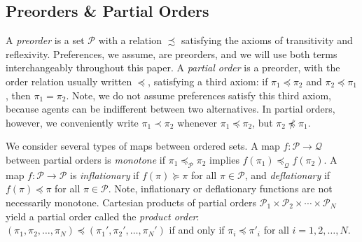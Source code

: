 \documentclass[conference]{ieeeconf}
\renewcommand{\preceq}{\preccurlyeq}
\renewcommand{\succeq}{\succcurlyeq}
\renewcommand{\P}{\mathcal{P}}
\newcommand{\Q}{\mathcal{Q}}
\renewcommand{\L}{\mathcal{L}}
\DeclareMathOperator{\Fix}{Fix}
\DeclareMathOperator{\Pre}{Prefix}
\DeclareMathOperator{\Post}{Suffix}
\DeclareMathOperator{\lfp}{lfp}
\DeclareMathOperator{\gfp}{gfp}
\newtheorem{lemma}{Lemma}
\begin{document}
\vspace{-0.25em}
\subsection{Preorders \& Partial Orders}
\vspace{-0.25em}

A \emph{preorder} is a set $\P$ with a relation $\precsim$ satisfying the axioms of transitivity and reflexivity. Preferences, we assume, are preorders, and we will use both terms interchangeably throughout this paper. A \emph{partial order} is a preorder, with the order relation usually written $\preceq$, satisfying a third axiom: if $\pi_1 \preceq \pi_2$ and $\pi_2 \preceq \pi_1$, then $\pi_1 = \pi_2$. Note, we do not assume preferences satisfy this third axiom, because agents can be indifferent between two alternatives. In partial orders, however, we conveniently write $\pi_1 \prec \pi_2$ whenever $\pi_1 \preceq \pi_2$, but $\pi_2 \not \preceq \pi_1$.

We consider several types of maps between ordered sets. A map $f: \P \to \Q$ between partial orders is \emph{monotone} if $\pi_1 \preceq_{\P} \pi_2$ implies $f(\pi_1) \preceq_{\Q} f(\pi_2)$. A map $f: \P \to \P$ is \emph{inflationary} if $f(\pi) \succeq \pi$ for all $\pi \in \P$, and \emph{deflationary} if $f(\pi) \preceq \pi$ for all $\pi \in \P$. Note, inflationary or deflationary functions are not necessarily monotone.
Cartesian products of partial orders $\P_1 \times \P_2 \times \cdots \times \P_N$ yield a partial order called the \emph{product order}: $(\pi_1, \pi_2, \dots, \pi_N) \preceq (\pi_1', \pi_2', \dots, \pi_N')$ if and only if $\pi_i \preceq \pi'_i$ for all $i = 1,2,\dots, N$. 

\end{document}
